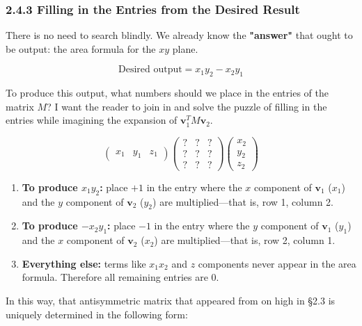 \documentclass[a4paper,12pt,openany]{book}
\providecommand{\tightlist}{%
  \setlength{\itemsep}{0pt}\setlength{\parskip}{0pt}}
\begin{document}
\hypertarget{filling-in-the-entries-from-the-desired-result}{%
\subsubsection{2.4.3 Filling in the Entries from the Desired
Result}\label{filling-in-the-entries-from-the-desired-result}}

There is no need to search blindly. We already know the
\textbf{"answer"} that ought to be output: the area formula for the
\(xy\) plane.

\[\text{Desired output} = x_1 y_2 - x_2 y_1\]

To produce this output, what numbers should we place in the entries of
the matrix \(M\)? I want the reader to join in and solve the puzzle of
filling in the entries while imagining the expansion of
\(\mathbf{v}_1^T M \mathbf{v}_2\).

\[
\begin{pmatrix} x_1 & y_1 & z_1 \end{pmatrix}
\begin{pmatrix}
  ? & ? & ? \\
  ? & ? & ? \\
  ? & ? & ?
\end{pmatrix}
\begin{pmatrix} x_2 \\ y_2 \\ z_2 \end{pmatrix}
\]

\begin{enumerate}
\def\labelenumi{\arabic{enumi}.}
\tightlist
\item
  \textbf{To produce \(x_1 y_2\):} place \(+1\) in the entry where the
  \(x\) component of \(\mathbf{v}_1\) (\(x_1\)) and the \(y\) component
  of \(\mathbf{v}_2\) (\(y_2\)) are multiplied—that is, row 1, column
  2.
\item
  \textbf{To produce \(-x_2 y_1\):} place \(-1\) in the entry where the
  \(y\) component of \(\mathbf{v}_1\) (\(y_1\)) and the \(x\) component
  of \(\mathbf{v}_2\) (\(x_2\)) are multiplied—that is, row 2, column
  1.
\item
  \textbf{Everything else:} terms like \(x_1 x_2\) and \(z\) components
  never appear in the area formula. Therefore all remaining entries are
  \(0\).
\end{enumerate}

In this way, that antisymmetric matrix that appeared from on high in
§2.3 is uniquely determined in the following form:
\end{document}
